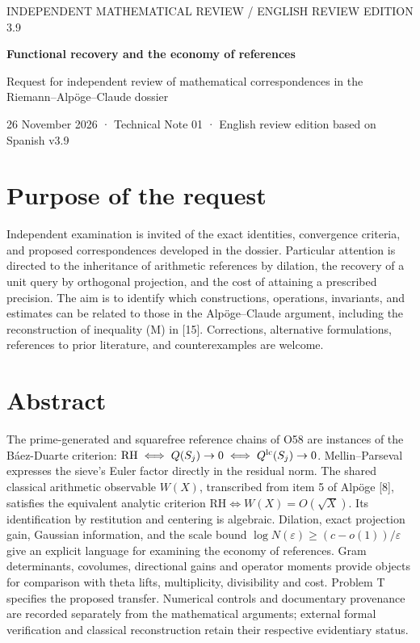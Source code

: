 \documentclass[11pt,a4paper]{article}
\newcommand{\RH}{\mathrm{RH}}
\begin{document}
{\sffamily\small\color{hd}INDEPENDENT MATHEMATICAL REVIEW / ENGLISH REVIEW EDITION 3.9}\par\vspace{1ex}
{\color{navy}\bfseries\fontsize{23}{27}\selectfont Functional recovery and the economy of references\par}
\vspace{0.8ex}
{\large Request for independent review of mathematical correspondences in the Riemann--Alpöge--Claude dossier}\par
{\small 26 November 2026 · Technical Note 01 · English review edition based on Spanish v3.9}\par
\section*{Purpose of the request}
Independent examination is invited of the exact identities, convergence criteria, and proposed correspondences developed in the dossier. Particular attention is directed to the inheritance of arithmetic references by dilation, the recovery of a unit query by orthogonal projection, and the cost of attaining a prescribed precision. The aim is to identify which constructions, operations, invariants, and estimates can be related to those in the Alpöge--Claude argument, including the reconstruction of inequality (M) in [15]. Corrections, alternative formulations, references to prior literature, and counterexamples are welcome.

\section*{Abstract}
The prime-generated and squarefree reference chains of O58 are instances of the Báez-Duarte criterion: $\RH\iff Q(S_j)\to0\iff Q^{\rm lc}(S_j)\to0$. Mellin--Parseval expresses the sieve's Euler factor directly in the residual norm. The shared classical arithmetic observable $W(X)$, transcribed from item 5 of Alpöge [8], satisfies the equivalent analytic criterion $\RH\iff W(X)=O(\sqrt X)$. Its identification by restitution and centering is algebraic. Dilation, exact projection gain, Gaussian information, and the scale bound $\log N(\varepsilon)\ge(c-o(1))/\varepsilon$ give an explicit language for examining the economy of references. Gram determinants, covolumes, directional gains and operator moments provide objects for comparison with theta lifts, multiplicity, divisibility and cost. Problem T specifies the proposed transfer. Numerical controls and documentary provenance are recorded separately from the mathematical arguments; external formal verification and classical reconstruction retain their respective evidentiary status.
\end{document}
